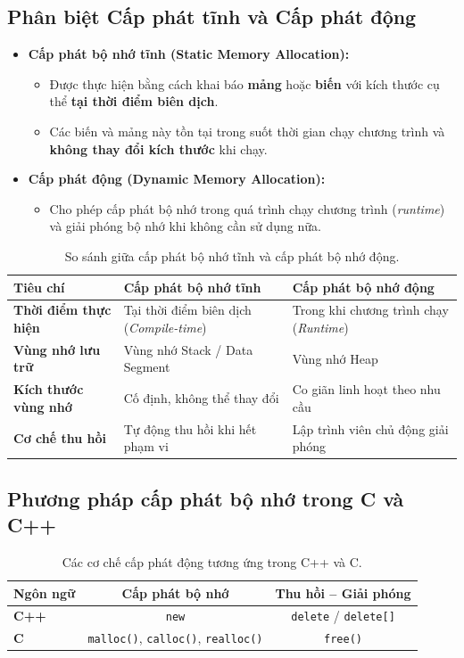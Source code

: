 \documentclass[12pt,a4paper]{article}
\begin{document}
\subsection{Phân biệt Cấp phát tĩnh và Cấp phát động}
\begin{itemize}[itemsep=0.2em]
    \item \textbf{Cấp phát bộ nhớ tĩnh (Static Memory Allocation):}
    \begin{itemize}
        \item Được thực hiện bằng cách khai báo \textbf{mảng} hoặc \textbf{biến} với kích thước cụ thể \textbf{tại thời điểm biên dịch}.
        \item Các biến và mảng này tồn tại trong suốt thời gian chạy chương trình và \textbf{không thay đổi kích thước} khi chạy.
    \end{itemize}
    \item \textbf{Cấp phát động (Dynamic Memory Allocation):}
    \begin{itemize}
        \item Cho phép cấp phát bộ nhớ trong quá trình chạy chương trình (\textit{runtime}) và giải phóng bộ nhớ khi không cần sử dụng nữa.
    \end{itemize}
\end{itemize}

\begin{table}[H]
\centering
\begin{tabularx}{\textwidth}{p{3.8cm}X X}
\toprule
\textbf{Tiêu chí} & \textbf{Cấp phát bộ nhớ tĩnh} & \textbf{Cấp phát bộ nhớ động} \\
\midrule
\textbf{Thời điểm thực hiện} & Tại thời điểm biên dịch (\textit{Compile-time}) & Trong khi chương trình chạy (\textit{Runtime}) \\
\textbf{Vùng nhớ lưu trữ} & Vùng nhớ Stack / Data Segment & Vùng nhớ Heap \\
\textbf{Kích thước vùng nhớ} & Cố định, không thể thay đổi & Co giãn linh hoạt theo nhu cầu \\
\textbf{Cơ chế thu hồi} & Tự động thu hồi khi hết phạm vi & Lập trình viên chủ động giải phóng \\
\bottomrule
\end{tabularx}
\caption{So sánh giữa cấp phát bộ nhớ tĩnh và cấp phát bộ nhớ động.}
\end{table}

\subsection{Phương pháp cấp phát bộ nhớ trong C và C++}
\begin{table}[H]
\centering
\begin{tabular}{lcc}
\toprule
\textbf{Ngôn ngữ} & \textbf{Cấp phát bộ nhớ} & \textbf{Thu hồi -- Giải phóng} \\
\midrule
\textbf{C++} & \texttt{new} & \texttt{delete} / \texttt{delete[]} \\
\textbf{C}   & \texttt{malloc()}, \texttt{calloc()}, \texttt{realloc()} & \texttt{free()} \\
\bottomrule
\end{tabular}
\caption{Các cơ chế cấp phát động tương ứng trong C++ và C.}
\end{table}
\end{document}
